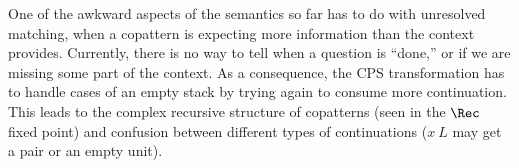 \documentclass[sigplan,screen]{acmart}
\begin{document}



One of the awkward aspects of the semantics so far has to do with unresolved
matching, when a copattern is expecting more information than the context
provides.  Currently, there is no way to tell when a question is ``done,'' or if
we are missing some part of the context.  As a consequence, the CPS
transformation has to handle cases of an empty stack by trying again to consume
more continuation.  This leads to the complex recursive structure of copatterns
(seen in the $\Rec$ fixed point) and confusion between different types of
continuations (\eg $x~L$ may get a pair or an empty unit).
\end{document}
